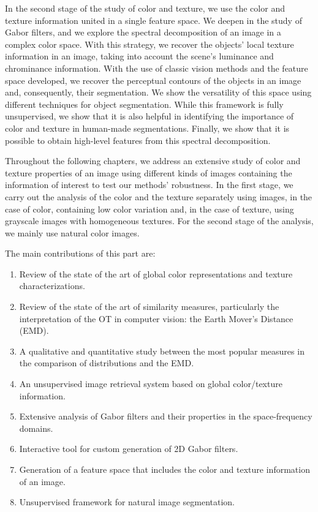 In the second stage of the study of color and texture, we use the color and texture information united in a single feature space. We deepen in the study of Gabor filters, and we explore the spectral decomposition of an image in a complex color space. With this strategy, we recover the objects' local texture information in an image, taking into account the scene's luminance and chrominance information. With the use of classic vision methods and the feature space developed, we recover the perceptual contours of the objects in an image and, consequently, their segmentation. We show the versatility of this space using different techniques for object segmentation. While this framework is fully unsupervised, we show that it is also helpful in identifying the importance of color and texture in human-made segmentations. Finally, we show that it is possible to obtain high-level features from this spectral decomposition.

Throughout the following chapters, we address an extensive study of color and texture properties of an image using different kinds of images containing the information of interest to test our methods' robustness. In the first stage, we carry out the analysis of the color and the texture separately using images, in the case of color, containing low color variation and, in the case of texture, using grayscale images with homogeneous textures. For the second stage of the analysis, we mainly use natural color images. 

The main contributions of this part are:
\begin{enumerate}
	\item Review of the state of the art of global color representations and texture characterizations.
	\item Review of the state of the art of similarity measures, particularly the interpretation of the OT in computer vision: the Earth Mover's Distance (EMD).
	\item A qualitative and quantitative study between the most popular measures in the comparison of distributions and the EMD. 
	\item An unsupervised image retrieval system based on global color/texture information.
	\item Extensive analysis of Gabor filters and their properties in the space-frequency domains.
	\item Interactive tool for custom generation of 2D Gabor filters.
	\item Generation of a feature space that includes the color and texture information of an image.
	\item Unsupervised framework for natural image segmentation.
\end{enumerate}


